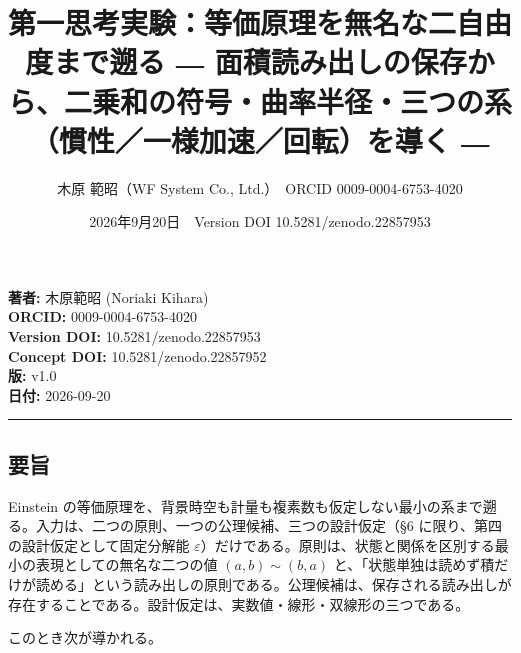 \documentclass[
  a4paper,
]{ltjsarticle}
\title{第一思考実験：等価原理を無名な二自由度まで遡る ―
面積読み出しの保存から、二乗和の符号・曲率半径・三つの系（慣性／一様加速／回転）を導く
―}
\author{木原 範昭（WF System Co., Ltd.）　ORCID 0009-0004-6753-4020}
\date{2026年9月20日　Version DOI 10.5281/zenodo.22857953}
\begin{document}
\maketitle

\textbf{著者:} 木原範昭 (Noriaki Kihara)\\
\textbf{ORCID:} 0009-0004-6753-4020\\
\textbf{Version DOI:} 10.5281/zenodo.22857953\\
\textbf{Concept DOI:} 10.5281/zenodo.22857952\\
\textbf{版:} v1.0\\
\textbf{日付:} 2026-09-20

\begin{center}\rule{0.5\linewidth}{0.5pt}\end{center}

\subsection{要旨}\label{ux8981ux65e8}

Einstein
の等価原理を、背景時空も計量も複素数も仮定しない最小の系まで遡る。入力は、二つの原則、一つの公理候補、三つの設計仮定（§6
に限り、第四の設計仮定として固定分解能
\(\varepsilon\)）だけである。原則は、状態と関係を区別する最小の表現としての無名な二つの値
\((a,b)\sim(b,a)\)
と、「状態単独は読めず積だけが読める」という読み出しの原則である。公理候補は、保存される読み出しが存在することである。設計仮定は、実数値・線形・双線形の三つである。

このとき次が導かれる。
\end{document}
